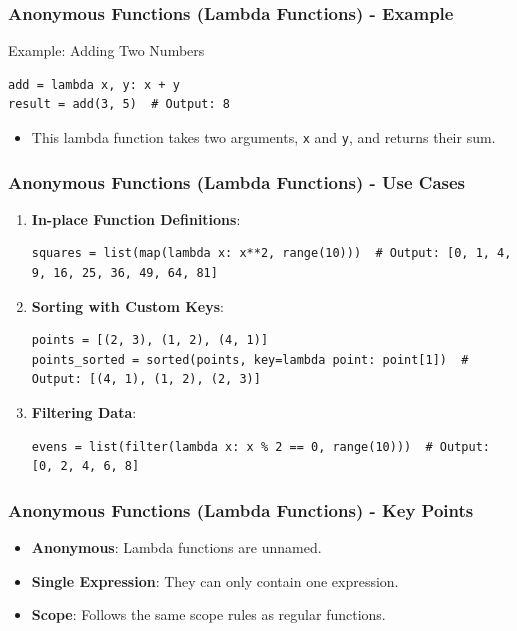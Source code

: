 \documentclass{beamer}
\begin{document}
\begin{frame}[fragile]
    \frametitle{Anonymous Functions (Lambda Functions) - Example}
    \begin{block}{Example: Adding Two Numbers}
        \begin{lstlisting}
add = lambda x, y: x + y
result = add(3, 5)  # Output: 8
        \end{lstlisting}
    \end{block}
    \begin{itemize}
        \item This lambda function takes two arguments, \texttt{x} and \texttt{y}, and returns their sum.
    \end{itemize}
\end{frame}

\begin{frame}[fragile]
    \frametitle{Anonymous Functions (Lambda Functions) - Use Cases}
    \begin{enumerate}
        \item \textbf{In-place Function Definitions}: 
            \begin{lstlisting}
squares = list(map(lambda x: x**2, range(10)))  # Output: [0, 1, 4, 9, 16, 25, 36, 49, 64, 81]
            \end{lstlisting}
        \item \textbf{Sorting with Custom Keys}: 
            \begin{lstlisting}
points = [(2, 3), (1, 2), (4, 1)]
points_sorted = sorted(points, key=lambda point: point[1])  # Output: [(4, 1), (1, 2), (2, 3)]
            \end{lstlisting}
        \item \textbf{Filtering Data}: 
            \begin{lstlisting}
evens = list(filter(lambda x: x % 2 == 0, range(10)))  # Output: [0, 2, 4, 6, 8]
            \end{lstlisting}
    \end{enumerate}
\end{frame}

\begin{frame}
    \frametitle{Anonymous Functions (Lambda Functions) - Key Points}
    \begin{itemize}
        \item \textbf{Anonymous}: Lambda functions are unnamed.
        \item \textbf{Single Expression}: They can only contain one expression.
        \item \textbf{Scope}: Follows the same scope rules as regular functions.
    \end{itemize}
\end{frame}
\end{document}
